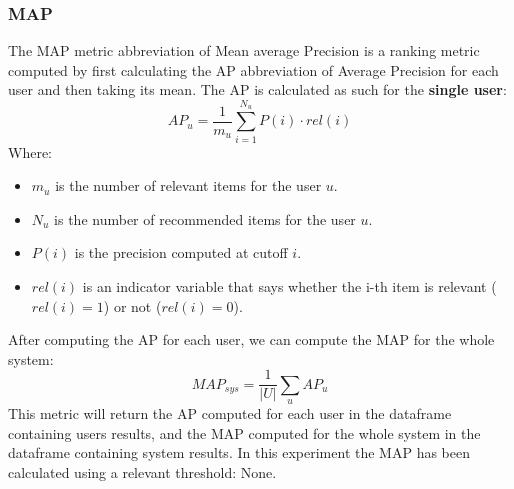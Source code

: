 \documentclass[11pt]{article}
\begin{document}
\subsubsection{MAP}\label{subsubsec:map}
The MAP metric abbreviation of Mean average Precision is a ranking metric computed by first calculating the AP
abbreviation of Average Precision for each user and then taking its mean.
The AP is calculated as such for the \textbf{single user}:
\hfill\break
\hfill\break
    \[
        AP_u = \frac{1}{m_u}\sum_{i=1}^{N_u}P(i)\cdot rel(i)
    \]
\hfill\break
\hfill\break
    Where:
\begin{itemize}
    \item $m_u$ is the number of relevant items for the user $u$.
    \item $N_u$ is the number of recommended items for the user $u$.
    \item $P(i)$ is the precision computed at cutoff $i$.
    \item $rel(i)$ is an indicator variable that says whether the i-th item is relevant ($rel(i)=1$) or not ($rel(i)=0$).
\end{itemize}
\hfill\break
\hfill\break
After computing the AP for each user, we can compute the MAP for the whole system:
\hfill\break
\hfill\break
    \[
        MAP_{sys} = \frac{1}{|U|}\sum_{u}AP_u
    \]
\hfill\break
\hfill\break
This metric will return the AP computed for each user in the dataframe containing users results, and the MAP
computed for the whole system in the dataframe containing system results.
In this experiment the MAP has been calculated using a relevant threshold:
None.
\hfill\break
\hfill\break


\end{document}
